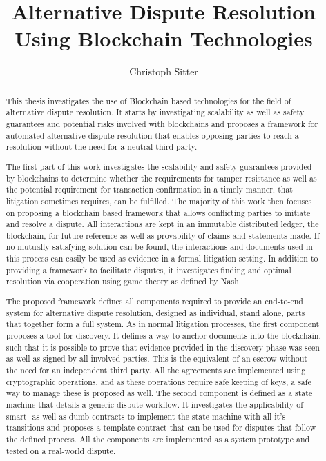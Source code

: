 \documentclass[12pt,msc,a4paper,oneside]{ucl_thesis}
\title{Alternative Dispute Resolution Using Blockchain Technologies}
\author{Christoph Sitter
}
\begin{document}
\maketitle
\makedeclaration


\begin{abstract}
    This thesis investigates the use of Blockchain based technologies for the field of alternative dispute resolution. It starts by investigating scalability as well as safety guarantees and potential risks involved with blockchains and proposes a framework for automated alternative dispute resolution that enables opposing parties to reach a resolution without the need for a neutral third party.

    The first part of this work investigates the scalability and safety guarantees provided by blockchains to determine whether the requirements for tamper resistance as well as the potential requirement for transaction confirmation in a timely manner, that litigation sometimes requires, can be fulfilled. The majority of this work then focuses on proposing a blockchain based framework that allows conflicting parties to initiate and resolve a dispute. All interactions are kept in an immutable distributed ledger, the blockchain, for future reference as well as provability of claims and statements made. If no mutually satisfying solution can be found, the interactions and documents used in this process can easily be used as evidence in a formal litigation setting. In addition to providing a framework to facilitate disputes, it investigates finding and optimal resolution via cooperation using game theory as defined by Nash.

    The proposed framework defines all components required to provide an end-to-end system for alternative dispute resolution, designed as individual, stand alone, parts that together form a full system. As in normal litigation processes, the first component proposes a tool for discovery. It defines a way to anchor documents into the blockchain, such that it is possible to prove that evidence provided in the discovery phase was seen as well as signed by all involved parties. This is the equivalent of an escrow without the need for an independent third party. All the agreements are implemented using cryptographic operations, and as these operations require safe keeping of keys, a safe way to manage these is proposed as well.
    The second component is defined as a state machine that details a generic dispute workflow. It investigates the applicability of smart- as well as dumb contracts to implement the state machine with all it's transitions and proposes a template contract that can be used for disputes that follow the defined process. All the components are implemented as a system prototype and tested on a real-world dispute.

\end{abstract}
\end{document}
